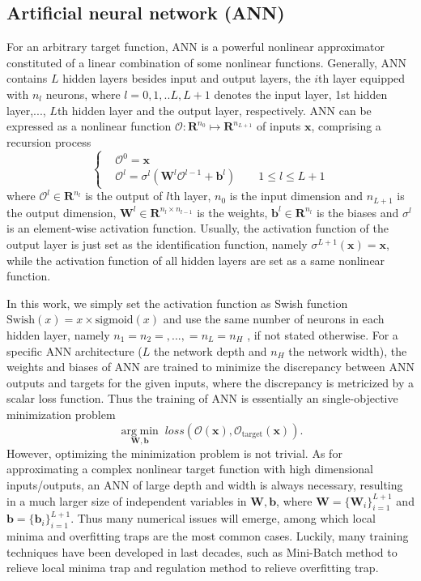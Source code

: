 \documentclass[preprint, 10pt]{elsarticle}
\begin{document}
\subsection{Artificial neural network (ANN) }
For an arbitrary target function, ANN is a powerful nonlinear approximator constituted of a linear combination of some nonlinear functions. Generally, ANN contains $L$ hidden layers besides input and output layers,  the $i$th layer equipped with $n_l$ neurons, where $l=0,1,..L,L+1$ denotes the input layer, 1st hidden layer,..., $L$th hidden layer and the output layer, respectively. ANN can be expressed as a nonlinear function $\mathcal{O}: \mathbf{R}^{n_0} \mapsto \mathbf{R}^{n_{L+1}}$ of inputs $\mathbf{x}$, comprising a  recursion process
\begin{equation}
\left \{
\begin{aligned}
&\mathcal{O}^{0}   = \mathbf{x} \\
&\mathcal{O}^{l}   = \sigma ^{l} \left( \mathbf{W}^{l} \mathcal{O}^{l-1} + \mathbf{b}^{l}
\right)
\qquad 1 \le l \le L+1
\end{aligned}
\right.
\end{equation}
where $\mathcal{O}^{l} \in \mathbf{R}^{n_l}$ is the output of $l$th layer, $n_0$ is the input dimension and $n_{L+1}$ is the output dimension, $\mathbf{W}^{l} \in \mathbf{R}^{n_{l} \times n_{l-1}}$ is the weights, $\mathbf{b}^{l} \in \mathbf{R}^{n_l}$ is the biases and $\sigma ^{l}$ is an element-wise activation function. Usually, the activation function of the output layer is just set as the identification function, namely $\sigma ^{L+1}\left(\mathbf{x}\right)=\mathbf{x}$, while the activation function of all hidden layers are set as a same nonlinear function.

In this work, we simply set the activation function as Swish function \cite{ramachandran2017searching} $ \text{Swish}(x) =x \times \text{sigmoid}(x)$ and use the same number of neurons in each hidden layer, namely $n_1=n_2=,...,=n_L=n_H$ , if not stated otherwise. For a specific ANN architecture ($L$ the network depth and $n_H$ the network width), the weights and biases of ANN are trained to minimize the discrepancy between ANN outputs and targets for the given inputs, where the discrepancy is metricized by a scalar loss function. Thus the training of ANN is essentially an single-objective minimization problem
\begin{equation}
\mathop {\arg \;\min }\limits_{{\mathbf{W,b}}} \;
loss\left( {\mathcal{O}\left(\mathbf{x}\right),\mathcal{O}_\text{target} \left(\mathbf{x}\right)} \right)
.
\end{equation}
However, optimizing the minimization problem is not trivial. As for approximating a complex nonlinear target function with high dimensional inputs/outputs, an ANN of large depth and width is always necessary, resulting in a much larger size of independent variables in $\mathbf{W,b}$, where $\mathbf{W}=\{\mathbf{W}_i\}_{i=1}^{L+1}$ and $\mathbf{b}=\{\mathbf{b}_i\}_{i=1}^{L+1}$. Thus many numerical issues will emerge, among which local minima and overfitting traps are the most common cases. Luckily, many training techniques have been developed in last decades, such as Mini-Batch method to relieve local minima trap and regulation method to relieve overfitting trap.
\end{document}
